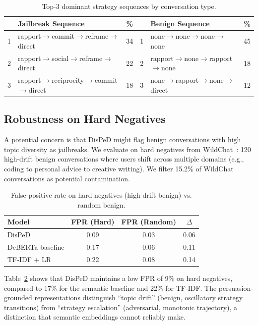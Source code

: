 \documentclass[11pt,a4paper]{article}
\begin{document}
\begin{table}[t]
\centering
\caption{Top-3 dominant strategy sequences by conversation type.}
\label{tab:dominant_sequences}
\small
\begin{tabular}{clcclc}
\toprule
 & \textbf{Jailbreak Sequence} & \textbf{\%} & & \textbf{Benign Sequence} & \textbf{\%} \\
\midrule
1 & rapport$\to$commit$\to$reframe$\to$direct & 34 & 1 & none$\to$none$\to$none$\to$none & 45 \\
2 & rapport$\to$social$\to$reframe$\to$direct & 22 & 2 & rapport$\to$none$\to$rapport$\to$none & 18 \\
3 & rapport$\to$reciprocity$\to$commit$\to$direct & 18 & 3 & none$\to$rapport$\to$none$\to$direct & 12 \\
\bottomrule
\end{tabular}
\end{table}

\subsection{Robustness on Hard Negatives}
\label{sec:hard_negatives}

A potential concern is that DisPeD might flag benign conversations with high topic diversity as jailbreaks. We evaluate on hard negatives from WildChat~\citep{zhao2024wildchat}: 120 high-drift benign conversations where users shift across multiple domains (e.g., coding to personal advice to creative writing). We filter 15.2\% of WildChat conversations as potential contamination.

\begin{table}[t]
\centering
\caption{False-positive rate on hard negatives (high-drift benign) vs. random benign.}
\label{tab:hard_negatives}
\begin{tabular}{lccc}
\toprule
\textbf{Model} & \textbf{FPR (Hard)} & \textbf{FPR (Random)} & \textbf{$\Delta$} \\
\midrule
DisPeD & 0.09 & 0.03 & 0.06 \\
DeBERTa baseline & 0.17 & 0.06 & 0.11 \\
TF-IDF + LR & 0.22 & 0.08 & 0.14 \\
\bottomrule
\end{tabular}
\end{table}

Table~\ref{tab:hard_negatives} shows that DisPeD maintains a low FPR of 9\% on hard negatives, compared to 17\% for the semantic baseline and 22\% for TF-IDF. The persuasion-grounded representations distinguish ``topic drift'' (benign, oscillatory strategy transitions) from ``strategy escalation'' (adversarial, monotonic trajectory), a distinction that semantic embeddings cannot reliably make.
\end{document}
